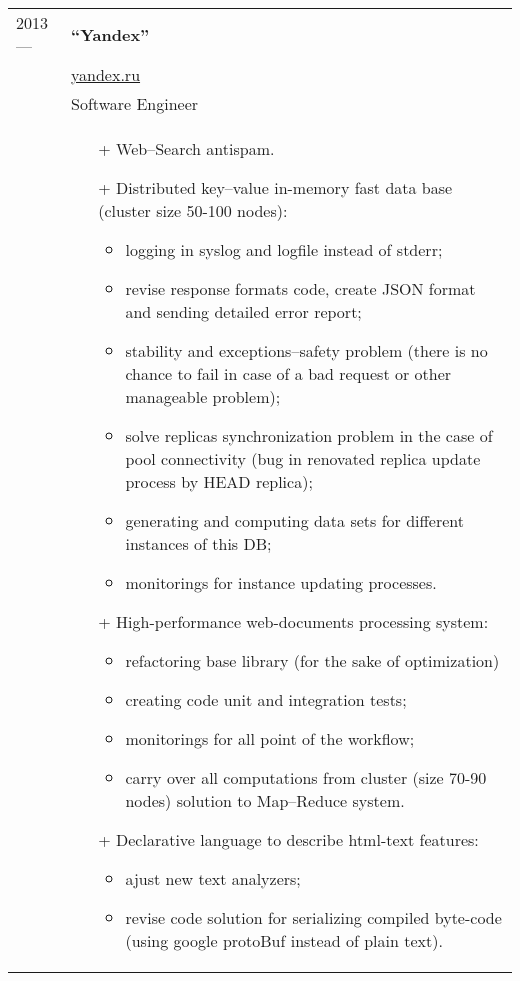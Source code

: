 \documentclass[a4paper, 10pt]{article}
\begin{document}
\begin{longtable}{p{20mm}|p{140mm}}
2013 ---
& \textbf{``Yandex''} \\
& \href{https://yandex.ru/}{yandex.ru} \\
& Software Engineer \\
& \begin{itemize}[topsep = 0pt, itemsep = 0pt]
    \item[+] Web--Search antispam.
    \item[+] Distributed key--value in-memory fast data base (cluster size 50-100 nodes):
        \begin{itemize}[topsep = 0pt, itemsep = 0pt]
            \item logging in syslog and logfile instead of stderr;
            \item revise response formats code, create JSON format and sending detailed error report;
            \item stability and exceptions--safety problem (there is no chance to fail in case of a bad request or other manageable problem);
            \item solve replicas synchronization problem in the case of pool connectivity (bug in renovated replica update process by HEAD replica);
            \item generating and computing data sets for different instances of this DB;
            \item monitorings for instance updating processes.
        \end{itemize}

    \item[+] High-performance web-documents processing system:
        \begin{itemize}[topsep = 0pt, itemsep = 0pt]
            \item refactoring base library (for the sake of optimization)
            \item creating code unit and integration tests;
            \item monitorings for all point of the workflow;
            \item carry over all computations from cluster (size 70-90 nodes) solution to Map--Reduce system.
        \end{itemize}
    \item[+] Declarative language to describe html-text features:
    \begin{itemize}[topsep = 0pt, itemsep = 0pt]
        \item ajust new text analyzers;
        \item revise code solution for serializing compiled byte-code (using google protoBuf instead of plain text).
    \end{itemize}



\end{itemize}
\end{longtable}
\end{document}
